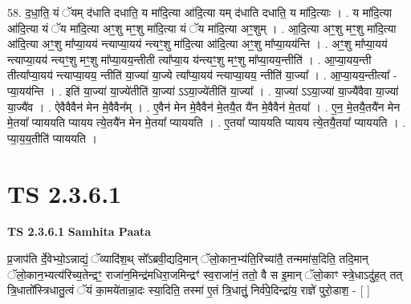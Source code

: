 \documentclass[17pt]{extarticle}
\begin{document}
58. द॒धा॒ति॒ यं ॅयम् द॑धाति दधाति॒ य मा॑दि॒त्या आ॑दि॒त्या यम् द॑धाति दधाति॒ य मा॑दि॒त्याः । . य मा॑दि॒त्या आ॑दि॒त्या यं ॅय मा॑दि॒त्या अꣳ॒॒शु मꣳ॒॒शु मा॑दि॒त्या यं ॅय मा॑दि॒त्या अꣳ॒॒शुम् । . आ॒दि॒त्या अꣳ॒॒शु मꣳ॒॒शु मा॑दि॒त्या आ॑दि॒त्या अꣳ॒॒शु मा᳚प्या॒यय॑ न्त्याप्या॒यय॑ न्त्यꣳ॒॒शु मा॑दि॒त्या आ॑दि॒त्या अꣳ॒॒शु मा᳚प्या॒यय॑न्ति । . अꣳ॒॒शु मा᳚प्या॒यय॑ न्त्याप्या॒यय॑ न्त्यꣳ॒॒शु मꣳ॒॒शु मा᳚प्या॒यय॒न्तीती त्या᳚प्या॒य य॑न्त्यꣳ॒॒शु मꣳ॒॒शु मा᳚प्या॒यय॒न्तीति॑ । . आ॒प्या॒यय॒न्ती तीत्या᳚प्या॒यय॑ न्त्याप्या॒यय॒ न्तीति॑ या॒ज्या॑ या॒ज्ये त्या᳚प्या॒यय॑ न्त्याप्या॒यय॒ न्तीति॑ या॒ज्या᳚ । . आ॒प्या॒यय॒न्तीत्या᳚ - प्या॒यय॑न्ति । . इति॑ या॒ज्या॑ या॒ज्ये॑तीति॑ या॒ज्या॑ ऽऽया॒ज्ये॑तीति॑ या॒ज्या᳚ । . या॒ज्या॑ ऽऽया॒ज्या॑ या॒ज्यै॑वैवा या॒ज्या॑ या॒ज्यै॑व । . ऐवैवैवैन॑ मेन मे॒वैवैन᳚म् । . ए॒वैन॑ मेन मे॒वैवैन॑ मे॒तयै॒त यै॑न मे॒वैवैन॑ मे॒तया᳚ । . ए॒न॒ मे॒तयै॒तयै॑न मेन मे॒तया᳚ प्याययति प्यायय त्ये॒तयै॑न मेन मे॒तया᳚ प्याययति । . ए॒तया᳚ प्याययति प्यायय त्ये॒तयै॒तया᳚ प्याययति । . प्या॒य॒य॒तीति॑ प्याययति । \newline
\pagebreak
{}
\section*{ TS 2.3.6.1 }

\textbf{TS 2.3.6.1 } \newline
\textbf{Samhita Paata} \newline

प्र॒जाप॑ति र्दे॒वेभ्यो॒ऽन्नाद्यं॒ ॅव्यादि॑श॒थ् सो᳚ऽब्रवी॒द्यदि॒मान् ॅलो॒कान॒भ्य॑ति॒रिच्या॑तै॒ तन्ममा॑स॒दिति॒ तदि॒मान् ॅलो॒कान॒भ्यत्य॑रिच्य॒तेन्द्रꣳ॒॒ राजा॑न॒मिन्द्र॑मधिरा॒जमिन्द्रꣳ॑ स्व॒राजा॑नं॒ ततो॒ वै स इ॒मान् ॅलो॒काꣳ स्त्रे॒धाऽदु॑ह॒त् तत् त्रि॒धातो᳚स्त्रिधातु॒त्वं ॅयं का॒मये॑तान्ना॒दः स्या॒दिति॒ तस्मा॑ ए॒तं त्रि॒धातुं॒ निर्व॑पे॒दिन्द्रा॑य॒ राज्ञे॑ पुरो॒डाश॒ - [  ] \newline
\end{document}
